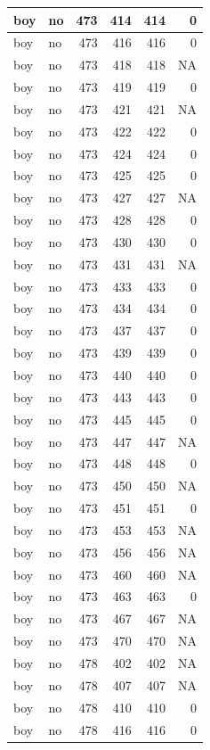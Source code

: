 \documentclass[man]{apa6}
\begin{document}
\begin{tabular}{l|l|r|r|r|r}
\hline
boy & no & 473 & 414 & 414 & 0\\
\hline
boy & no & 473 & 416 & 416 & 0\\
\hline
boy & no & 473 & 418 & 418 & NA\\
\hline
boy & no & 473 & 419 & 419 & 0\\
\hline
boy & no & 473 & 421 & 421 & NA\\
\hline
boy & no & 473 & 422 & 422 & 0\\
\hline
boy & no & 473 & 424 & 424 & 0\\
\hline
boy & no & 473 & 425 & 425 & 0\\
\hline
boy & no & 473 & 427 & 427 & NA\\
\hline
boy & no & 473 & 428 & 428 & 0\\
\hline
boy & no & 473 & 430 & 430 & 0\\
\hline
boy & no & 473 & 431 & 431 & NA\\
\hline
boy & no & 473 & 433 & 433 & 0\\
\hline
boy & no & 473 & 434 & 434 & 0\\
\hline
boy & no & 473 & 437 & 437 & 0\\
\hline
boy & no & 473 & 439 & 439 & 0\\
\hline
boy & no & 473 & 440 & 440 & 0\\
\hline
boy & no & 473 & 443 & 443 & 0\\
\hline
boy & no & 473 & 445 & 445 & 0\\
\hline
boy & no & 473 & 447 & 447 & NA\\
\hline
boy & no & 473 & 448 & 448 & 0\\
\hline
boy & no & 473 & 450 & 450 & NA\\
\hline
boy & no & 473 & 451 & 451 & 0\\
\hline
boy & no & 473 & 453 & 453 & NA\\
\hline
boy & no & 473 & 456 & 456 & NA\\
\hline
boy & no & 473 & 460 & 460 & NA\\
\hline
boy & no & 473 & 463 & 463 & 0\\
\hline
boy & no & 473 & 467 & 467 & NA\\
\hline
boy & no & 473 & 470 & 470 & NA\\
\hline
boy & no & 478 & 402 & 402 & NA\\
\hline
boy & no & 478 & 407 & 407 & NA\\
\hline
boy & no & 478 & 410 & 410 & 0\\
\hline
boy & no & 478 & 416 & 416 & 0\\

\end{tabular}
\end{document}
